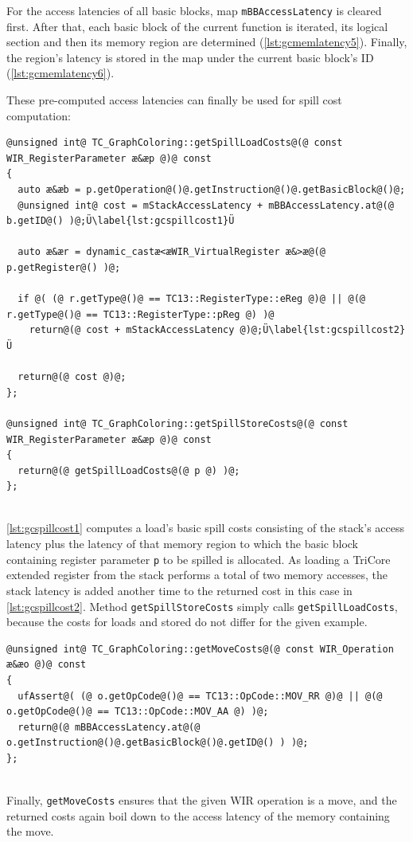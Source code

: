 For the access latencies of all basic blocks, map \texttt{mBBAccessLatency} is cleared first.
After that, each basic block of the current function is iterated, its logical section and then its memory region are determined (\cref{lst:gcmemlatency5}).
Finally, the region's latency is stored in the map under the current basic block's ID (\cref{lst:gcmemlatency6}).

These pre-computed access latencies can finally be used for spill cost computation: \\
\begin{lstlisting}[style=code,float=!ht,aboveskip=-0.8 \baselineskip,belowskip=-0.8 \baselineskip]
@unsigned int@ TC_GraphColoring::getSpillLoadCosts@(@ const WIR_RegisterParameter æ&æp @)@ const
{
  auto æ&æb = p.getOperation@()@.getInstruction@()@.getBasicBlock@()@;
  @unsigned int@ cost = mStackAccessLatency + mBBAccessLatency.at@(@ b.getID@() )@;Ü\label{lst:gcspillcost1}Ü

  auto æ&ær = dynamic_castæ<æWIR_VirtualRegister æ&>æ@(@ p.getRegister@() )@;

  if @( (@ r.getType@()@ == TC13::RegisterType::eReg @)@ || @(@ r.getType@()@ == TC13::RegisterType::pReg @) )@
    return@(@ cost + mStackAccessLatency @)@;Ü\label{lst:gcspillcost2}Ü

  return@(@ cost @)@;
};

@unsigned int@ TC_GraphColoring::getSpillStoreCosts@(@ const WIR_RegisterParameter æ&æp @)@ const
{
  return@(@ getSpillLoadCosts@(@ p @) )@;
};
\end{lstlisting}
\\
\cref{lst:gcspillcost1} computes a load's basic spill costs consisting of the stack's access latency plus the latency of that memory region to which the basic block containing register parameter \texttt{p} to be spilled is allocated.
As loading a TriCore extended register from the stack performs a total of two memory accesses, the stack latency is added another time to the returned cost in this case in \cref{lst:gcspillcost2}.
Method \texttt{getSpillStoreCosts} simply calls \texttt{getSpillLoadCosts}, because the costs for loads and stored do not differ for the given example. \\
\begin{lstlisting}[style=code,float=!ht,aboveskip=-0.8 \baselineskip,belowskip=-0.8 \baselineskip]
@unsigned int@ TC_GraphColoring::getMoveCosts@(@ const WIR_Operation æ&æo @)@ const
{
  ufAssert@( (@ o.getOpCode@()@ == TC13::OpCode::MOV_RR @)@ || @(@ o.getOpCode@()@ == TC13::OpCode::MOV_AA @) )@;
  return@(@ mBBAccessLatency.at@(@ o.getInstruction@()@.getBasicBlock@()@.getID@() ) )@;
};
\end{lstlisting}
\\
Finally, \texttt{getMoveCosts} ensures that the given \gls{WIR} operation is a move, and the returned costs again boil down to the access latency of the memory containing the move.


